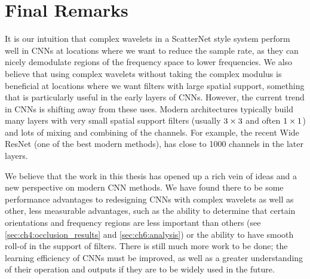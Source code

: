 \section{Final Remarks}

It is our intuition that complex wavelets in a ScatterNet style system perform well in
CNNs at locations where we want to reduce the sample rate, as they can nicely
demodulate regions of the frequency space to lower frequencies. We also believe
that using complex wavelets without taking the complex modulus is beneficial at
locations where we want filters with large spatial support, something that
is particularly useful in the early layers of CNNs. However, the current trend
in CNNs is shifting away from these uses. Modern architectures typically build
many layers with very small spatial support filters (usually $3\times 3$ and often
$1\times 1$) and lots of mixing and combining of the channels. For example, the
recent Wide ResNet \cite{zagoruyko_wide_2016} (one of the best modern methods),
has close to 1000 channels in the later layers.

We believe that the work in this thesis has opened up a rich vein of ideas and a
new perspective on modern CNN methods. We have found there to be some
performance advantages to redesigning CNNs with complex wavelets as well as
other, less measurable advantages, such as the ability to determine that certain
orientations and frequency regions are less important than others (see
\autoref{sec:ch4:occlusion_results} and \autoref{sec:ch6:analysis}) or the
ability to have smooth roll-of in the support of filters. There is still much
more work to be done; the learning efficiency of CNNs must be improved, as well
as a greater understanding of their operation and outputs if they are to be
widely used in the future.

